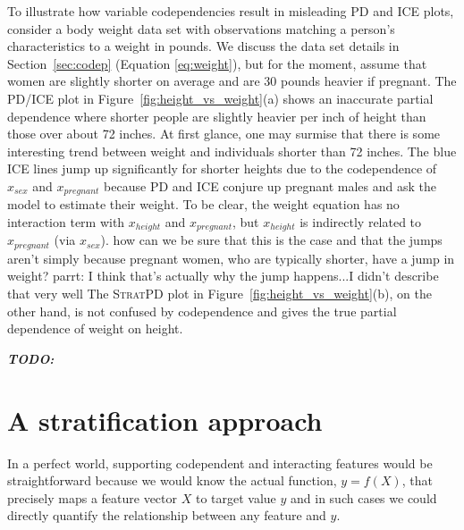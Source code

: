 \documentclass[12pt]{article}
\newcommand{\secref}[1]{Section~\ref{#1}}
\newcommand{\figref}[1]{Figure~\ref{#1}}
\newcommand{\todo}[1]{{\bf\em TODO:} {{\color{red}{#1}}}}
\newcommand{\spd}{\fontfamily{cmr}\textsc{\small StratPD}}
\begin{document}
To illustrate how variable codependencies result in misleading PD and ICE plots, consider a body weight data set with observations matching a person's characteristics to a weight in pounds. We discuss the data set details in \secref{sec:codep} (Equation \eqref{eq:weight}), but for the moment, assume that women are slightly shorter on average and are 30 pounds heavier if pregnant. The PD/ICE plot in \figref{fig:height_vs_weight}(a) shows an inaccurate partial dependence where shorter people are slightly heavier per inch of height than those over about 72 inches. At first glance, one may surmise that there is some interesting trend between weight and individuals shorter than 72 inches. The blue ICE lines jump up significantly for shorter heights due to the codependence of $x_{sex}$ and $x_{pregnant}$ because PD and ICE conjure up pregnant males and ask the model to estimate their weight. To be clear, the weight equation has no interaction term with $x_{height}$ and $x_{pregnant}$, but $x_{height}$ is indirectly related to $x_{pregnant}$ (via $x_{sex}$). {\color{red} how can we be sure that this is the case and that the jumps aren't simply because pregnant women, who are typically shorter, have a jump in weight? parrt: I think that's actually why the jump happens...I didn't describe that very well} The \spd{} plot in \figref{fig:height_vs_weight}(b), on the other hand, is not confused by codependence and gives the true partial dependence of weight on height. 

\todo{needs a transition sentence here}

\section{A stratification approach}

In a perfect world, supporting codependent and interacting features would be straightforward because we would know the actual function, $y = f(X)$, that precisely maps a feature vector $X$ to target value $y$ and in such cases we could directly quantify the relationship between any feature and $y$. 
\end{document}
